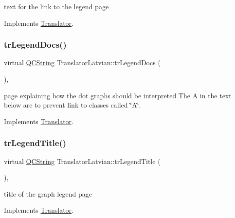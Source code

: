 text for the link to the legend page 

Implements \mbox{\hyperlink{class_translator}{Translator}}.

\mbox{\label{class_translator_latvian_adf0012745dfab4069701c6025f5df45d}} 
\subsubsection{\texorpdfstring{trLegendDocs()}{trLegendDocs()}}
{\footnotesize\ttfamily virtual \mbox{\hyperlink{class_q_c_string}{Q\+C\+String}} Translator\+Latvian\+::tr\+Legend\+Docs (\begin{DoxyParamCaption}{ }\end{DoxyParamCaption})\hspace{0.3cm}{\ttfamily [inline]}, {\ttfamily [virtual]}}

page explaining how the dot graph\textquotesingle{}s should be interpreted The A in the text below are to prevent link to classes called \char`\"{}\+A\char`\"{}. 

Implements \mbox{\hyperlink{class_translator}{Translator}}.

\mbox{\label{class_translator_latvian_ac4a6956c3ab5375cd0b27c1d37c01450}} 
\subsubsection{\texorpdfstring{trLegendTitle()}{trLegendTitle()}}
{\footnotesize\ttfamily virtual \mbox{\hyperlink{class_q_c_string}{Q\+C\+String}} Translator\+Latvian\+::tr\+Legend\+Title (\begin{DoxyParamCaption}{ }\end{DoxyParamCaption})\hspace{0.3cm}{\ttfamily [inline]}, {\ttfamily [virtual]}}

title of the graph legend page 

Implements \mbox{\hyperlink{class_translator}{Translator}}.

\mbox{\label{class_translator_latvian_afd19dbe67d2168354525ccc8acdafc37}} 
